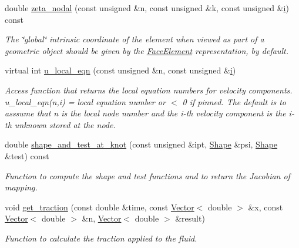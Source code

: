 \begin{DoxyCompactItemize}
\item 
double \hyperlink{classoomph_1_1NavierStokesTractionElement_a8ddd7c891c2654ea277fc569b4a0725a}{zeta\+\_\+nodal} (const unsigned \&n, const unsigned \&k, const unsigned \&\hyperlink{cfortran_8h_adb50e893b86b3e55e751a42eab3cba82}{i}) const
\begin{DoxyCompactList}\small\item\em The \char`\"{}global\char`\"{} intrinsic coordinate of the element when viewed as part of a geometric object should be given by the \hyperlink{classoomph_1_1FaceElement}{Face\+Element} representation, by default. \end{DoxyCompactList}\item 
virtual int \hyperlink{classoomph_1_1NavierStokesTractionElement_a61e835222d62341faf05a991b1be04c4}{u\+\_\+local\+\_\+eqn} (const unsigned \&n, const unsigned \&\hyperlink{cfortran_8h_adb50e893b86b3e55e751a42eab3cba82}{i})
\begin{DoxyCompactList}\small\item\em Access function that returns the local equation numbers for velocity components. u\+\_\+local\+\_\+eqn(n,i) = local equation number or $<$ 0 if pinned. The default is to asssume that n is the local node number and the i-\/th velocity component is the i-\/th unknown stored at the node. \end{DoxyCompactList}\item 
double \hyperlink{classoomph_1_1NavierStokesTractionElement_a55f3d90286a5fd98dfdae7ac8a5b1b0f}{shape\+\_\+and\+\_\+test\+\_\+at\+\_\+knot} (const unsigned \&ipt, \hyperlink{classoomph_1_1Shape}{Shape} \&psi, \hyperlink{classoomph_1_1Shape}{Shape} \&test) const
\begin{DoxyCompactList}\small\item\em Function to compute the shape and test functions and to return the Jacobian of mapping. \end{DoxyCompactList}\item 
void \hyperlink{classoomph_1_1NavierStokesTractionElement_ab5b0454a2b29fc69938235af430702bf}{get\+\_\+traction} (const double \&time, const \hyperlink{classoomph_1_1Vector}{Vector}$<$ double $>$ \&x, const \hyperlink{classoomph_1_1Vector}{Vector}$<$ double $>$ \&n, \hyperlink{classoomph_1_1Vector}{Vector}$<$ double $>$ \&result)
\begin{DoxyCompactList}\small\item\em Function to calculate the traction applied to the fluid. \end{DoxyCompactList}\item 

\end{DoxyCompactItemize}
